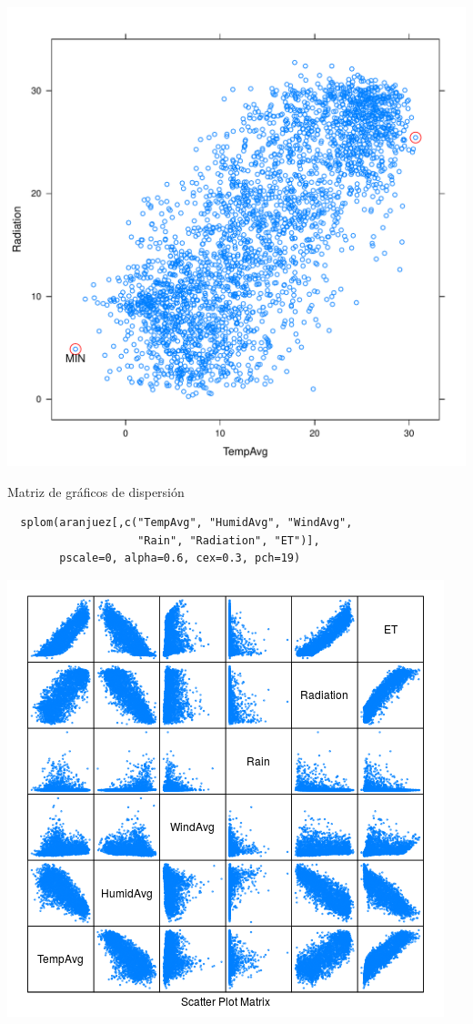 \documentclass[xcolor={usenames,svgnames,dvipsnames}]{beamer}
\begin{document}
\begin{frame}[label=sec-2-1-29]{}
\includegraphics[width=.9\linewidth]{figs/panel.pdf}
\end{frame}

\begin{frame}[fragile,label=sec-2-1-30]{Matriz de gráficos de dispersión}
 \lstset{language=R,label= ,caption= ,numbers=none}
\begin{lstlisting}
  splom(aranjuez[,c("TempAvg", "HumidAvg", "WindAvg",
                    "Rain", "Radiation", "ET")],
        pscale=0, alpha=0.6, cex=0.3, pch=19)
\end{lstlisting}
\end{frame}

\begin{frame}[label=sec-2-1-31]{}
\includegraphics[width=.9\linewidth]{figs/splom.png}
\end{frame}
\end{document}
